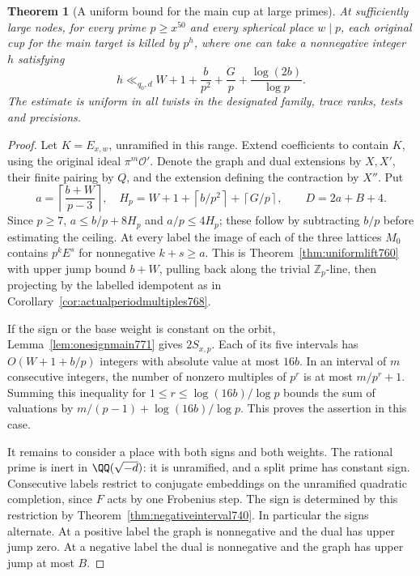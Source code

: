 \documentclass[a4paper,11pt]{article}
\newtheorem{theorem}[proposition]{Theorem}
\theoremstyle{definition}
\theoremstyle{remark}
\newcommand{\ZZ}{\mathbb Z}\newcommand{\ord}{\operatorname{ord}}
\numberwithin{equation}{section}
\begin{document}
\begin{theorem}[A uniform bound for the main cup at large primes]
\leavevmode\label{thm:mainorbit776}
At sufficiently large nodes, for every prime \(p\ge x^{50}\)
and every spherical place \(w\mid p\), each original
cup for the main target is killed by \(p^h\), where one
can take a nonnegative integer \(h\) satisfying
\[
 h\ll_{q_0,d}
       W+1+\frac{b}{p^2}+\frac{G}{p}
                    +\frac{\log(2b)}{\log p}.
\]
The estimate is uniform in all twists in the designated
family, trace ranks, tests and precisions.
\end{theorem}
\begin{proof}
Let \(K=E_{x,w}\), unramified in this range. Extend
coefficients to contain \(K\), using the original ideal
\(\pi^m\mathcal O'\). Denote the graph and dual extensions
by \(X,X'\), their finite pairing by \(Q\), and the
extension defining the contraction by \(X''\). Put
\[
 a=\left\lceil\frac{b+W}{p-3}\right\rceil,\quad
 H_p=W+1+\left\lceil b/p^2\right\rceil+\left\lceil G/p\right\rceil,
 \qquad D=2a+B+4 .
\]
Since \(p\ge7\), \(a\le b/p+8H_p\) and \(a/p\le4H_p\);
these follow by subtracting \(b/p\) before estimating the
ceiling. At every label the image of each of the three
lattices \(M_0\) contains \(p^k E^s\) for nonnegative
\(k+s\ge a\). This is Theorem~\ref{thm:uniformlift760}
with upper jump bound \(b+W\), pulling back along the
trivial \(\ZZ_p\)-line, then projecting by the labelled
idempotent as in Corollary~\ref{cor:actualperiodmultiples768}.

If the sign or the base weight is constant on the orbit,
Lemma~\ref{lem:onesignmain771} gives \(2S_{x,p}\).
Each of its five intervals has \(O(W+1+b/p)\) integers
with absolute value at most \(16b\). In an interval of
\(m\) consecutive integers, the number of nonzero
multiples of \(p^r\) is at most \(m/p^r+1\).
Summing this inequality for \(1\le r\le\log(16b)/\log p\)
bounds the sum of valuations by \(m/(p-1)+
\log(16b)/\log p\). This proves the assertion in this case.

It remains to consider a place with both signs and both
weights. The rational prime is inert in \(\QQ(\sqrt{-d})\):
it is unramified, and a split prime has constant sign.
Consecutive labels restrict to conjugate embeddings on
the unramified quadratic completion, since \(F\) acts by
one Frobenius step. The sign is determined by this
restriction by Theorem~\ref{thm:negativeinterval740}.
In particular the signs alternate. At a positive label
the graph is nonnegative and the dual has upper jump
zero. At a negative label the dual is nonnegative and
the graph has upper jump at most \(B\).


\end{proof}
\end{document}
